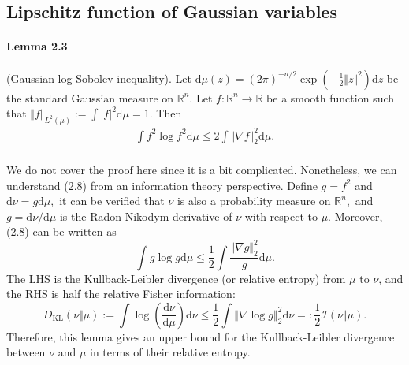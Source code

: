 \documentclass{article}
\begin{document}
\subsection{Lipschitz function of Gaussian variables}
\paragraph{Lemma 2.3} (Gaussian log-Sobolev inequality). Let $\mathrm{d}\mu(z) = (2\pi)^{-n/2}\exp\left(-\frac{1}{2}\Vert z\Vert^2\right)\mathrm{d}z$ be the standard Gaussian measure on $\mathbb{R}^n.$ Let $f:\mathbb{R}^n\to\mathbb{R}$ be a smooth function such that $\Vert f\Vert_{L^2(\mu)} := \int \vert f\vert^2\mathrm{d}\mu = 1$. Then
\begin{align*}
	\int f^2\log f^2\mathrm{d}\mu \leq 2\int\Vert\nabla f\Vert_2^2\mathrm{d}\mu.\tag{2.8}
\end{align*}

\paragraph{} We do not cover the proof here since it is a bit complicated. Nonetheless, we can understand (2.8) from an information theory perspective. Define $g = f^2$ and $\mathrm{d}\nu=g\mathrm{d}\mu,$ it can be verified that $\nu$ is also a probability measure on $\mathbb{R}^n,$ and $g=\mathrm{d}\nu/\mathrm{d}\mu$ is the Radon-Nikodym derivative of $\nu$ with respect to $\mu.$ Moreover, (2.8) can be written as
\begin{equation*}
	\int g\log g\mathrm{d}\mu \leq \frac{1}{2}\int\frac{\Vert\nabla g\Vert_2^2}{g}\mathrm{d}\mu.\tag{2.9}
\end{equation*}
The LHS is the Kullback-Leibler divergence (or relative entropy) from $\mu$ to $\nu$, and the RHS is half the relative Fisher information:
\begin{equation*}
	D_{\mathrm{KL}}(\nu\Vert\mu) := \int\log\left(\frac{\mathrm{d}\nu}{\mathrm{d}\mu}\right)\mathrm{d}\nu\leq
	\frac{1}{2}\int\left\Vert\nabla\log g\right\Vert_2^2\mathrm{d}\nu =: \frac{1}{2}\mathcal{I}(\nu\Vert\mu).\tag{2.10}
\end{equation*}
Therefore, this lemma gives an upper bound for the Kullback-Leibler divergence between $\nu$ and $\mu$ in terms of their relative entropy.
\end{document}
